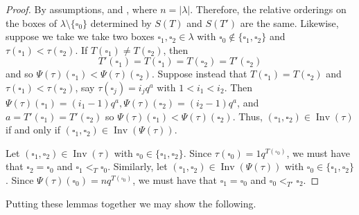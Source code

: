 \documentclass[pdftex]{sigma}
\numberwithin{equation}{section}
\theoremstyle{definition}
\DeclareMathOperator{\Inv}{\mathrm{Inv}}
\begin{document}
\begin{proof}
By assumptions,  and , where $n = |\lambda| $. Therefore, the relative orderings on the boxes of $\lambda \setminus \{\square_0\}$ determined by $S(T)$ and $S(T')$ are the same. Likewise, suppose we take we take two boxes $\square_1,\square_2 \in \lambda$ with $\square_0 \notin \{\square_1,\square_2\}$ and $\tau(\square_1) < \tau(\square_2)$. If $T(\square_1) \neq T(\square_2)$, then
\[
T'(\square_1) = T(\square_1) = T(\square_2) = T'(\square_2)
\]
 and so $\Psi(\tau)(\square_1) < \Psi(\tau)(\square_2)$. Suppose instead that $T(\square_1) = T(\square_2)$ and $\tau(\square_1) < \tau(\square_2)$, say $\tau(\square_j) = i_jq^{a}$ with $1< i_1 <i_2$. Then $\Psi(\tau)(\square_1) = (i_1-1)q^{a}, \Psi(\tau)(\square_2) = (i_2-1)q^{a}$, and $a = T'(\square_1) = T'(\square_2)$ so $\Psi(\tau)(\square_1) < \Psi(\tau)(\square_2)$. Thus, $(\square_1,\square_2) \in \Inv(\tau)$ if and only if $(\square_1,\square_2) \in \Inv(\Psi(\tau))$.

Let $(\square_1,\square_2) \in \Inv(\tau)$ with $\square_0 \in \{\square_1,\square_2\}$. Since $\tau(\square_0) = 1q^{T(\square_0)}$, we must have that $\square_2 = \square_0$ and $\square_1 <_{T} \square_0$. Similarly, let $(\square_1,\square_2) \in \Inv(\Psi(\tau))$ with $\square_0 \in \{\square_1,\square_2\}$. Since $\Psi(\tau)(\square_0) = nq^{T(\square_0)}$, we must have that $\square_1 = \square_0$ and $\square_0 <_{T'} \square_2$.
\end{proof}

Putting these lemmas together we may show the following.
\end{document}
